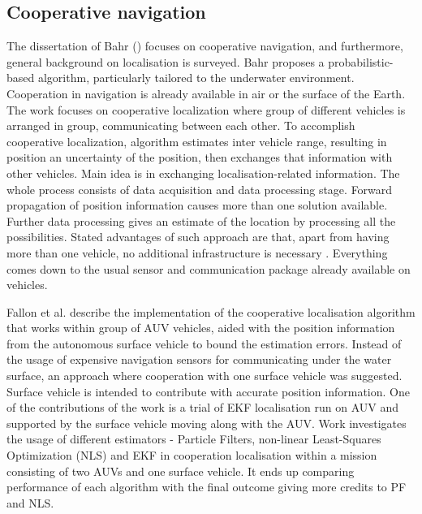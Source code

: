\subsection{Cooperative navigation}
The dissertation of Bahr (\cite{bahr08}) focuses on cooperative navigation, and furthermore, general background on localisation is surveyed. Bahr proposes a probabilistic-based algorithm, particularly tailored to the underwater environment. Cooperation in navigation is already available in air or the surface of the Earth. The work focuses on cooperative localization where group of different vehicles is arranged in group, communicating between each other. To accomplish cooperative localization, algorithm estimates inter vehicle range, resulting in position an uncertainty of the position, then exchanges that information with other vehicles. Main idea is in exchanging  localisation-related information. The whole process consists of data acquisition and data processing stage. Forward propagation of position information causes more than one solution available. Further data processing gives an estimate of the location by processing all the possibilities. Stated advantages of such approach are that, apart from having more than one vehicle, no additional infrastructure is necessary \cite{bahr08}. Everything comes down to the usual sensor and communication package already available on vehicles\cite{bahr08}. 

Fallon et al. \cite{fallon10} describe the implementation of the cooperative localisation algorithm that works within group of AUV vehicles, aided with the position information from the autonomous surface vehicle to bound the estimation errors. Instead of the usage of expensive navigation sensors for communicating under the water surface, an approach where cooperation with one surface vehicle was suggested. Surface vehicle is intended to contribute with accurate position information. One of the contributions of the work is a trial of EKF localisation run on AUV and supported by the surface vehicle moving along with the AUV. Work investigates the usage of different estimators - Particle Filters, non-linear Least-Squares Optimization (NLS) and EKF in cooperation localisation within a mission consisting of two AUVs and one surface vehicle. It ends up comparing performance of each algorithm with the final outcome giving more credits to PF and NLS. 